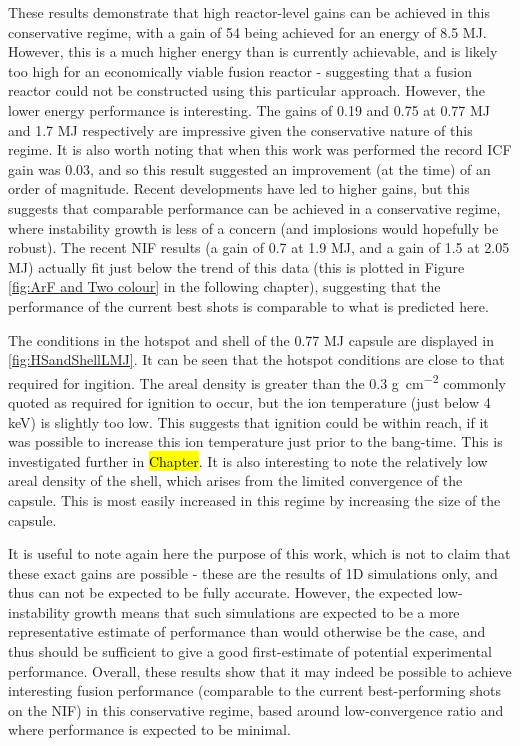 These results demonstrate that high reactor-level gains can be achieved in this conservative regime, with a gain of 54 being achieved for an energy of 8.5 \unit{\mega\joule}. However, this is a much higher energy than is currently achievable, and is likely too high for an economically viable fusion reactor - suggesting that a fusion reactor could not be constructed using this particular approach. However, the lower energy performance is interesting. The gains of 0.19 and 0.75 at 0.77 \unit{\mega\joule} and 1.7 \unit{\mega\joule} respectively are impressive given the conservative nature of this regime. It is also worth noting that when this work was performed the record ICF gain was 0.03, and so this result suggested an improvement (at the time) of an order of magnitude. Recent developments have led to higher gains, but this suggests that comparable performance can be achieved in a conservative regime, where instability growth is less of a concern (and implosions would hopefully be robust). The recent NIF results (a gain of 0.7 at 1.9 MJ, and a gain of 1.5 at 2.05 MJ) actually fit just below the trend of this data (this is plotted in Figure \ref{fig:ArF and Two colour} in the following chapter), suggesting that the performance of the current best shots is comparable to what is predicted here.

The conditions in the hotspot and shell of the 0.77 \unit{\mega\joule} capsule are displayed in \ref{fig:HSandShellLMJ}. It can be seen that the hotspot conditions are close to that required for ingition. The areal density is greater than the 0.3 \unit{\gram\per\centi\meter\squared} commonly quoted as required for ignition to occur, but the ion temperature (just below 4 keV) is slightly too low. This suggests that ignition could be within reach, if it was possible to increase this ion temperature just prior to the bang-time. This is investigated further in \hl{Chapter}. It is also interesting to note the relatively low areal density of the shell, which arises from the limited convergence of the capsule. This is most easily increased in this regime by increasing the size of the capsule.

It is useful to note again here the purpose of this work, which is not to claim that these exact gains are possible - these are the results of 1D simulations only, and thus can not be expected to be fully accurate. However, the expected low-instability growth means that such simulations are expected to be a more representative estimate of performance than would otherwise be the case, and thus should be sufficient to give a good first-estimate of potential experimental performance. Overall, these results show that it may indeed be possible to achieve interesting fusion performance (comparable to the current best-performing shots on the NIF) in this conservative regime, based around low-convergence ratio and where performance is expected to be minimal.

